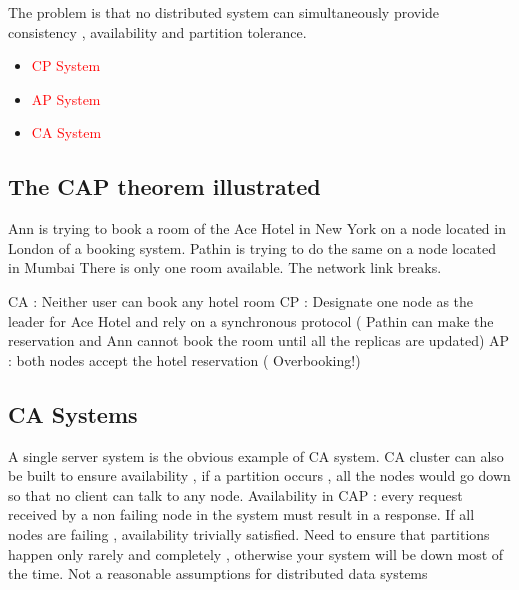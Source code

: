 \documentclass{article}
\begin{document}
The problem is that no distributed system can simultaneously provide consistency , availability and partition tolerance.

\begin{itemize}
    \item \textcolor{red}{CP System} 
    \item \textcolor{red}{AP System}
    
    \item \textcolor{red}{CA System} 
\end{itemize}

\subsection{The CAP theorem illustrated }
Ann is trying to book a room of the Ace Hotel in New York on a node located in London of a booking system.
Pathin is trying to do the same on a node located in Mumbai
There is only one room available.
The network link breaks.

CA : Neither user can book any hotel room
CP : Designate one node as the leader for Ace Hotel and rely on a synchronous protocol ( Pathin can make the reservation and Ann cannot book the room until all the replicas are updated)
AP : both nodes accept the hotel reservation ( Overbooking!)

\subsection{CA Systems}
A single server system is the obvious example of CA system.
CA cluster can also be built to ensure availability , if a partition occurs , all the nodes would go down so that no client can talk to any node.
Availability in CAP : every request received by a non failing node in the system must result in a response.
If all nodes are failing , availability trivially satisfied.
Need to ensure that partitions happen only rarely and completely , otherwise your system will be down most of the time.
Not a reasonable assumptions for distributed data systems
\end{document}
